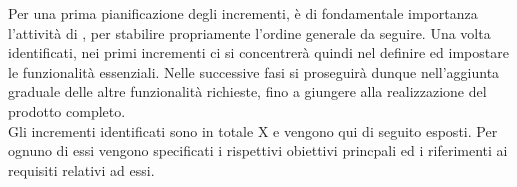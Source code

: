 Per una prima pianificazione degli incrementi, è di fondamentale importanza l'attività di \glo{\AdR{}}, per stabilire propriamente l'ordine generale da seguire. Una volta identificati, nei primi incrementi ci si concentrerà quindi nel definire ed impostare le funzionalità essenziali. Nelle successive fasi si proseguirà dunque nell'aggiunta graduale delle altre funzionalità richieste, fino a giungere alla realizzazione del prodotto completo. \\
Gli incrementi identificati sono in totale X e vengono qui di seguito esposti. Per ognuno di essi vengono specificati i rispettivi obiettivi princpali ed i riferimenti ai requisiti relativi ad essi.


